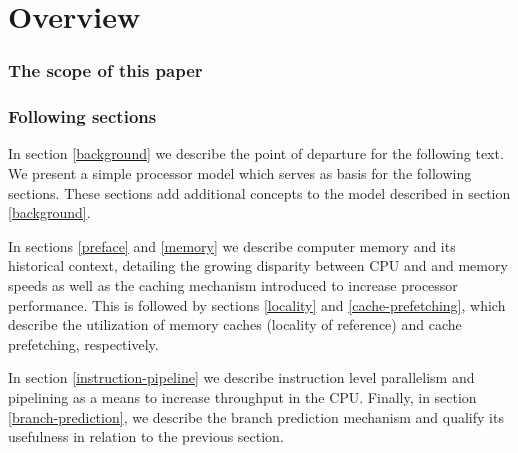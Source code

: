 
\section{Overview}\label{overview}

\subsubsection{The scope of this paper}


\subsubsection{Following sections}

In section \ref{background} we describe the point of departure for the following
text. We present a simple processor model which serves as basis for the
following sections. These sections add additional concepts to the model
described in section \ref{background}.

In sections \ref{preface} and \ref{memory} we describe computer memory and its
historical context, detailing the growing disparity between CPU and and memory
speeds as well as the caching mechanism introduced to increase processor
performance. This is followed by sections \ref{locality} and
\ref{cache-prefetching}, which describe the utilization of memory caches
(locality of reference) and cache prefetching, respectively.

In section \ref{instruction-pipeline} we describe instruction level parallelism
and pipelining as a means to increase throughput in the CPU.  Finally, in
section \ref{branch-prediction}, we describe the branch prediction mechanism and
qualify its usefulness in relation to the previous section.

